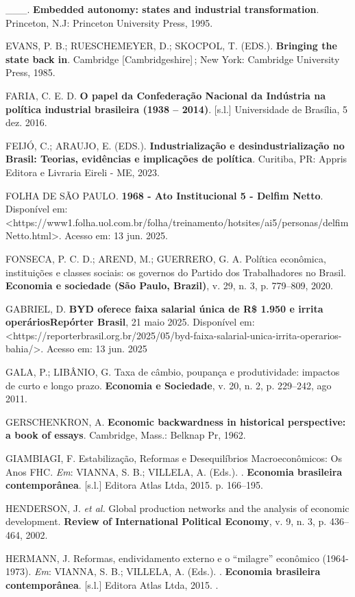 \_\_\_. \textbf{Embedded autonomy: states and industrial
transformation}. Princeton, N.J: Princeton University Press, 1995.

EVANS, P. B.; RUESCHEMEYER, D.; SKOCPOL, T. (EDS.). \textbf{Bringing the
state back in}. Cambridge {[}Cambridgeshire{]}\,; New York: Cambridge
University Press, 1985.

FARIA, C. E. D. \textbf{O papel da Confederação Nacional da Indústria na
política industrial brasileira (1938 -- 2014)}. {[}s.l.{]} Universidade
de Brasília, 5 dez. 2016.

FEIJÓ, C.; ARAUJO, E. (EDS.). \textbf{Industrialização e
desindustrialização no Brasil: Teorias, evidências e implicações de
política}. Curitiba, PR: Appris Editora e Livraria Eireli - ME, 2023.

FOLHA DE SÃO PAULO. \textbf{1968 - Ato Institucional 5 - Delfim Netto}.
Disponível em:
\textless https://www1.folha.uol.com.br/folha/treinamento/hotsites/ai5/personas/delfimNetto.html\textgreater.
Acesso em: 13 jun. 2025.

FONSECA, P. C. D.; AREND, M.; GUERRERO, G. A. Política econômica,
instituições e classes sociais: os governos do Partido dos Trabalhadores
no Brasil. \textbf{Economia e sociedade (São Paulo, Brazil)}, v. 29, n.
3, p. 779--809, 2020.

GABRIEL, D. \textbf{BYD oferece faixa salarial única de R\$ 1.950 e
irrita operáriosRepórter Brasil}, 21 maio 2025. Disponível em:
\textless https://reporterbrasil.org.br/2025/05/byd-faixa-salarial-unica-irrita-operarios-bahia/\textgreater.
Acesso em: 13 jun. 2025

GALA, P.; LIBÂNIO, G. Taxa de câmbio, poupança e produtividade: impactos
de curto e longo prazo. \textbf{Economia e Sociedade}, v. 20, n. 2, p.
229--242, ago 2011.

GERSCHENKRON, A. \textbf{Economic backwardness in historical
perspective: a book of essays}. Cambridge, Mass.: Belknap Pr, 1962.

GIAMBIAGI, F. Estabilização, Reformas e Desequilíbrios Macroeconômicos:
Os Anos FHC. \emph{Em}: VIANNA, S. B.; VILLELA, A. (Eds.). .
\textbf{Economia brasileira contemporânea}. {[}s.l.{]} Editora Atlas
Ltda, 2015. p. 166--195.

HENDERSON, J. \emph{et al.} Global production networks and the analysis
of economic development. \textbf{Review of International Political
Economy}, v. 9, n. 3, p. 436--464, 2002.

HERMANN, J. Reformas, endividamento externo e o ``milagre'' econômico
(1964-1973). \emph{Em}: VIANNA, S. B.; VILLELA, A. (Eds.). .
\textbf{Economia brasileira contemporânea}. {[}s.l.{]} Editora Atlas
Ltda, 2015. .

